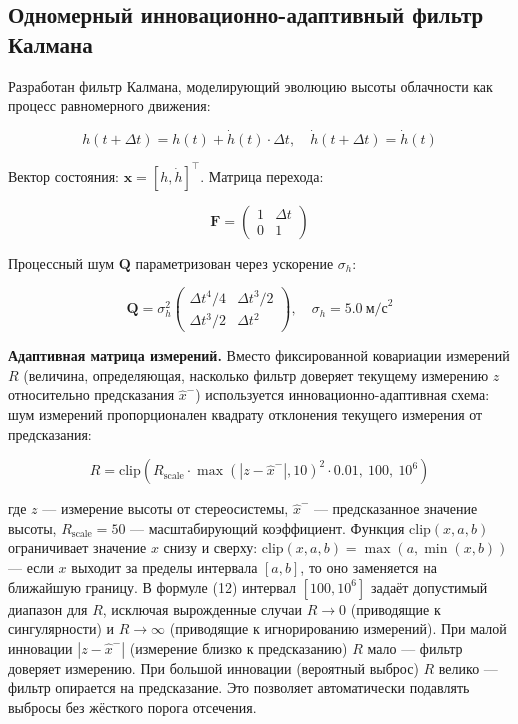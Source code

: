 \documentclass[11pt]{article} %
\begin{document}
	\subsection{Одномерный инновационно-адаптивный фильтр Калмана}
	\label{sec:kalman}
	
	Разработан фильтр Калмана, моделирующий эволюцию высоты облачности как процесс равномерного движения:
	
	\begin{equation}
		h(t + \Delta t) = h(t) + \dot{h}(t) \cdot \Delta t, \quad \dot{h}(t + \Delta t) = \dot{h}(t)
	\end{equation}
	
	Вектор состояния: $\mathbf{x} = [h, \dot{h}]^\top$. Матрица перехода:
	
	\begin{equation}
		\mathbf{F} = \begin{pmatrix} 1 & \Delta t \\ 0 & 1 \end{pmatrix}
	\end{equation}
	
	Процессный шум $\mathbf{Q}$ параметризован через ускорение $\sigma_h$:
	
	\begin{equation}
		\mathbf{Q} = \sigma_h^2 \begin{pmatrix} \Delta t^4/4 & \Delta t^3/2 \\ \Delta t^3/2 & \Delta t^2 \end{pmatrix}, \quad \sigma_h = 5.0\ \text{м/с}^2
	\end{equation}
	
	\textbf{Адаптивная матрица измерений.} Вместо фиксированной ковариации измерений $R$ (величина, определяющая, насколько фильтр доверяет текущему измерению $z$ относительно предсказания $\hat{x}^-$) используется инновационно-адаптивная схема: шум измерений пропорционален квадрату отклонения текущего измерения от предсказания:
	
	\begin{equation}
		R = \text{clip}(R_\text{scale} \cdot \max(|z - \hat{x}^-|, 10)^2 \cdot 0.01,\ 100,\ 10^6)
	\end{equation}
	
	где $z$ --- измерение высоты от стереосистемы, $\hat{x}^-$ --- предсказанное значение высоты, $R_\text{scale} = 50$ --- масштабирующий коэффициент. Функция $\text{clip}(x, a, b)$ ограничивает значение $x$ снизу и сверху: $\text{clip}(x, a, b) = \max(a, \min(x, b))$ --- если $x$ выходит за пределы интервала $[a, b]$, то оно заменяется на ближайшую границу. В формуле (12) интервал $[100, 10^6]$ задаёт допустимый диапазон для $R$, исключая вырожденные случаи $R \to 0$ (приводящие к сингулярности) и $R \to \infty$ (приводящие к игнорированию измерений). При малой инновации $|z - \hat{x}^-|$ (измерение близко к предсказанию) $R$ мало — фильтр доверяет измерению. При большой инновации (вероятный выброс) $R$ велико — фильтр опирается на предсказание. Это позволяет автоматически подавлять выбросы без жёсткого порога отсечения.
	
\end{document}
